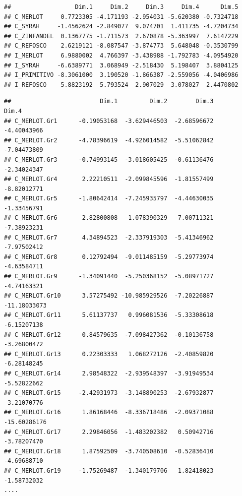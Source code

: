 \documentclass[
]{book}
\newenvironment{Shaded}{\begin{snugshade}}{\end{snugshade}}
\newcommand{\CommentTok}[1]{\textcolor[rgb]{0.56,0.35,0.01}{\textit{#1}}}
\newcommand{\NormalTok}[1]{#1}
\newcommand{\SpecialCharTok}[1]{\textcolor[rgb]{0.81,0.36,0.00}{\textbf{#1}}}
\begin{document}
\begin{verbatim}
##                  Dim.1     Dim.2     Dim.3     Dim.4      Dim.5
## C_MERLOT     0.7723305 -4.171193 -2.954031 -5.620380 -0.7324718
## C_SYRAH     -1.4562624 -2.849077  9.074701  1.411735 -4.7204734
## C_ZINFANDEL  0.1367775 -1.711573  2.670878 -5.363997  7.6147229
## C_REFOSCO    2.6219121 -8.087547 -3.874773  5.648048 -0.3530799
## I_MERLOT     6.9880002  4.766397 -3.438988 -1.792783 -4.0954920
## I_SYRAH     -6.6389771  3.068949 -2.518430  5.198407  3.8804125
## I_PRIMITIVO -8.3061000  3.190520 -1.866387 -2.559056 -4.0406986
## I_REFOSCO    5.8823192  5.793524  2.907029  3.078027  2.4470802
\end{verbatim}

\begin{Shaded}
\end{Shaded}

\begin{verbatim}
##                         Dim.1         Dim.2        Dim.3        Dim.4
## C_MERLOT.Gr1      -0.19053168  -3.629446503  -2.68596672  -4.40043966
## C_MERLOT.Gr2      -4.78396619  -4.926014582  -5.51062842  -7.04473809
## C_MERLOT.Gr3      -0.74993145  -3.018605425  -0.61136476  -2.34024347
## C_MERLOT.Gr4       2.22210511  -2.099845596  -1.81557499  -8.82012771
## C_MERLOT.Gr5      -1.80642414  -7.245935797  -4.44630035  -1.33456791
## C_MERLOT.Gr6       2.82800808  -1.078390329  -7.00711321  -7.38923231
## C_MERLOT.Gr7       4.34894523  -2.337919303  -5.41346962  -7.97502412
## C_MERLOT.Gr8       0.12792494  -9.011485159  -5.29773974  -4.63584711
## C_MERLOT.Gr9      -1.34091440  -5.250368152  -5.08971727  -4.74163321
## C_MERLOT.Gr10      3.57275492 -10.985929526  -7.20226887 -11.18033073
## C_MERLOT.Gr11      5.61137737   0.996081536  -5.33308618  -6.15207138
## C_MERLOT.Gr12      0.84579635  -7.098427362  -0.10136758  -3.26800472
## C_MERLOT.Gr13      0.22303333   1.068272126  -2.40859820  -6.28148245
## C_MERLOT.Gr14      2.98548322  -2.939548397  -3.91949534  -5.52822662
## C_MERLOT.Gr15     -2.42931973  -3.148890253  -2.67932877  -3.21070776
## C_MERLOT.Gr16      1.86168446  -8.336718486  -2.09371088 -15.60286176
## C_MERLOT.Gr17      2.29846056  -1.483202382   0.50942716  -3.78207470
## C_MERLOT.Gr18      1.87592509  -3.740508610  -0.52836410  -4.69688710
## C_MERLOT.Gr19     -1.75269487  -1.340179706   1.82418023  -1.58732032
....
\end{verbatim}
\end{document}
